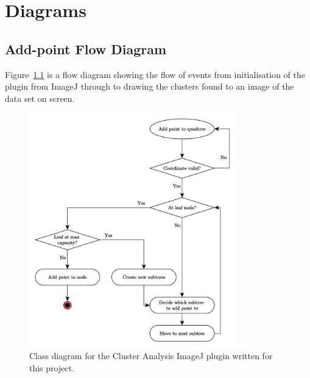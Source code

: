 
\chapter{Diagrams}
\label{cha:diagrams}

\section{Add-point Flow Diagram}
\label{sec:add_point_flow_diagram}

Figure~\ref{fig:add-point-flow-diagram} is a flow diagram showing the flow of
events from initialisation of the plugin from ImageJ through to drawing the
clusters found to an image of the data set on screen.

\begin{figure}[tbh]
	\centering
	\includegraphics[width=0.8\textwidth]{add-point-flow-chart.pdf}

	\caption[Class diagram for the Cluster Analysis ImageJ plugin.]{Class
		diagram for the Cluster Analysis ImageJ plugin written for this
		project.}\label{fig:add-point-flow-diagram}
\end{figure}
